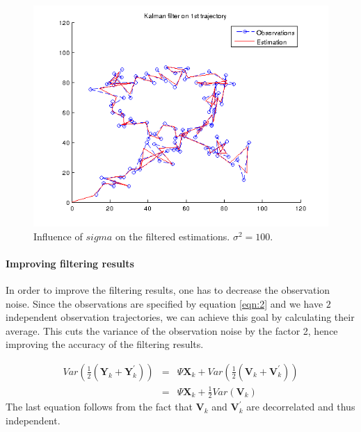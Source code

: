 \documentclass[a4paper, 12pt, titlepage]{article}
\begin{document}
\begin{figure}
	\includegraphics[width=15cm]{images/sigma10.png}
	\caption{Influence of $sigma$ on the filtered estimations. $\sigma^2=100$.}
	\label{fig:6}
\end{figure}

\paragraph{Improving filtering results}

In order to improve the filtering results, one has to decrease the observation noise. 
Since the observations are specified by equation \ref{eqn:2} and we have $2$ independent observation trajectories, we can achieve this goal by calculating their average.
This cuts the variance of the observation noise by the factor 2, hence improving the accuracy of the filtering results.

\begin{eqnarray}
	Var \left( \frac{1}{2}(\pmb{Y}_k+\pmb{Y}^{\prime}_k) \right)&=& \Psi\pmb{X}_k + Var \left( \frac{1}{2} (\pmb{V}_k + \pmb{V}^{\prime}_k )\right)\\
	&=& \Psi\pmb{X}_k + \frac{1}{2} Var\left(\pmb{V}_k \right)
\end{eqnarray}
The last equation follows from the fact that $\pmb{V}_k$ and $\pmb{V}^{\prime}_k$ are decorrelated and thus independent.
\end{document}
